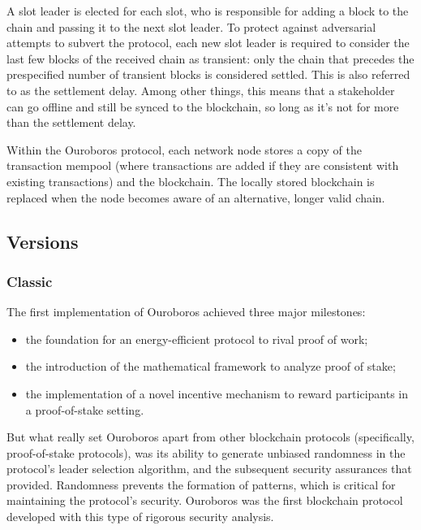 \noindent
A slot leader is elected for each slot, who is responsible for adding a 
block to the chain and passing it to the next slot leader. To protect 
against adversarial attempts to subvert the protocol, each new slot leader 
is required to consider the last few blocks of the received chain as 
transient: only the chain that precedes the prespecified number of transient 
blocks is considered settled. This is also referred to as the settlement 
delay. Among other things, this means that a stakeholder can go offline and 
still be synced to the blockchain, so long as it's not for more than the 
settlement delay.

\vspace{0.2cm}

\noindent
Within the Ouroboros protocol, each network node stores a copy of the 
transaction mempool (where transactions are added if they are consistent 
with existing transactions) and the blockchain. The locally stored blockchain 
is replaced when the node becomes aware of an alternative, longer valid chain.

\vspace{0.2cm}

\subsection{Versions}

\subsubsection{Classic}

The first implementation of Ouroboros achieved three major milestones:
\begin{itemize}
    \item the foundation for an energy-efficient protocol to rival proof of work;
    \item the introduction of the mathematical framework to analyze proof of stake;
    \item the implementation of a novel incentive mechanism to reward participants 
        in a proof-of-stake setting.
\end{itemize}

\noindent
But what really set Ouroboros apart from other blockchain protocols (specifically, 
proof-of-stake protocols), was its ability to generate unbiased randomness in the 
protocol's leader selection algorithm, and the subsequent security assurances that 
provided. Randomness prevents the formation of patterns, which is critical for 
maintaining the protocol's security. Ouroboros was the first blockchain protocol 
developed with this type of rigorous security analysis.

